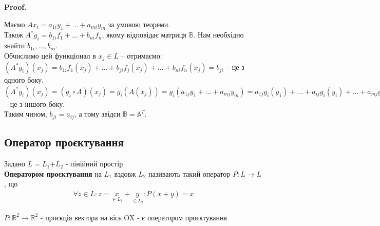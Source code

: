 \documentclass[a4paper, 10pt]{article}
\makeatletter
\theoremstyle{theoremdd}
\newtheorem{definition}[theorem]{Definition}
\renewenvironment{proof}[1][Proof.\\]{\par
\pushQED{\hfill \qed}%
\normalfont \topsep6\p@\@plus6\p@\relax
\trivlist
\item\relax
{\bfseries
#1\@addpunct{.}}\hspace\labelsep\ignorespaces
}{%
\popQED\endtrivlist\@endpefalse
}
\makeatother
\begin{document}
\begin{proof}
Маємо $A x_i = a_{1i}y_1 + \dots + a_{mi}y_m$ за умовою теореми.\\
Також $A^* g_i = b_{1i}f_1 + \dots + b_{ni}f_n$, якому відповідає матриця $\mathbb{B}$. Нам необхідно знайти $b_{1i},\dots,b_{ni}$.\\
Обчислимо цей функціонал в $x_j \in L$ -- отримаємо:\\
$(A^* g_i)(x_j) = b_{1i}f_1(x_j) + \dots + b_{ji}f_j(x_j) + \dots + b_{ni}f_n(x_j) = b_{ji}$ -- це з одного боку.\\
$(A^* g_i)(x_j) = (g_i \circ A)(x_j) = g_i(A(x_j)) = g_i(a_{1j}y_1 + \dots + a_{mj}y_m) = a_{1j}g_i(y_1) + \dots + a_{ij}g_i(y_i) + \dots + a_{mj}g_i(y_m) = a_{ij}$ -- це з іншого боку.\\
Таким чином, $b_{ji} = a_{ij}$, а тому звідси $\mathbb{B} = \mathbb{A}^T$.
\end{proof}

\iffalse
\subsection{Фактор-оператори}
\begin{definition}
Задано: $A: L \to L$ - лінійний оператор.\\
\textbf{Фактор-оператором} називають оператор $A_{L/_M}: L/_M \to L/_M$, що задається таким чином:
\begin{align*}
A_{L/_M}(x + M) =  Ax + M
\end{align*}
\end{definition}
\fi


\iffalse
\subsection{Оператор проєктування}
 Задано $L = L_1 \dot{+} L_2$ - лінійний простір\\
\textbf{Оператором проєктування} на $L_1$ вздовж $L_2$ називають такий оператор $P: L \to L$, що
\begin{align*}
\forall z \in L: z = \underset{\in L_1}{x}+\underset{\in L_2}{y}: P(x+y) = x
\end{align*}

 $P: \mathbb{R}^2 \to \mathbb{R}^2$ - проєкція вектора на вісь OX - є оператором проєктування
\begin{figure}[H]
\centering
\end{figure}
\end{document}
